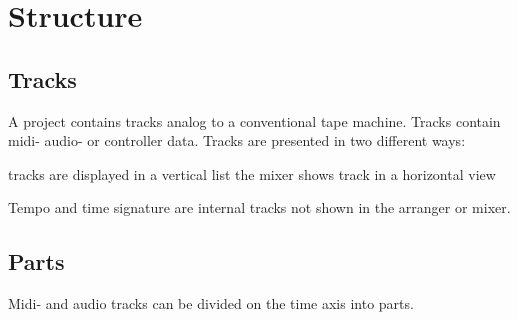 \chapter{Structure}
  \section{Tracks}

      A project contains tracks analog to a conventional tape machine.
      Tracks contain midi- audio- or controller data.
      Tracks are presented in two different ways:

      \blank[big]
       tracks are displayed in a vertical list
       the mixer shows track in a horizontal view

      \par\blank[big]

      Tempo and time signature are internal tracks not shown in the
      arranger or mixer.

  \section{Parts}

      Midi- and audio tracks can be divided on the time axis into parts.
